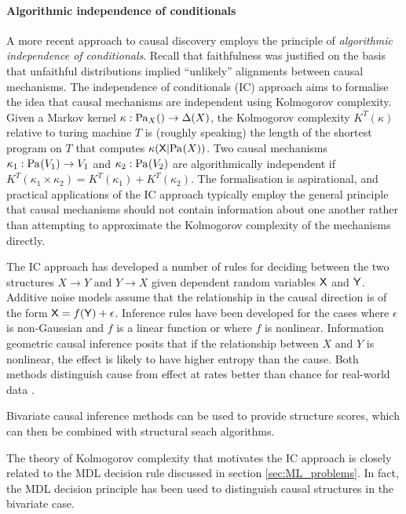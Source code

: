 \paragraph{Algorithmic independence of conditionals}

A more recent approach to causal discovery employs the principle of \emph{algorithmic independence of conditionals}. Recall that faithfulness was justified on the basis that unfaithful distributions implied ``unlikely'' alignments between causal mechanisms. The independence of conditionals (IC) approach aims to formalise the idea that causal mechanisms are independent using Kolmogorov complexity. Given a Markov kernel $\kappa:\text{Pa}_{X}()\to \Delta(X)$, the Kolmogorov complexity $K^T(\kappa)$ relative to turing machine $T$ is (roughly speaking) the length of the shortest program on $T$ that computes $\kappa(\mathsf{X}|\text{Pa}_{}(X))$\cite{kolmogorov_three_1968,lemeire_replacing_2013}. Two causal mechanisms $\kappa_1:\text{Pa}_{}(V_1)\to V_1$ and $\kappa_2:\text{Pa}_{}(V_2)$ are algorithmically independent if $K^T(\kappa_1\times\kappa_2)=K^T(\kappa_1)+K^T(\kappa_2)$. The formalisation is aspirational, and practical applications of the IC approach typically employ the general principle that causal mechanisms should not contain information about one another rather than attempting to approximate the Kolmogorov complexity of the mechanisms directly\cite{lemeire_replacing_2013}. 

The IC approach has developed a number of rules for deciding between the two structures $X\to Y$ and $Y\to X$ given dependent random variables $\mathsf{X}$ and $\mathsf{Y}$. Additive noise models assume that the relationship in the causal direction is of the form $\mathsf{X}=f(\mathsf{Y})+\epsilon$. Inference rules have been developed for the cases where $\epsilon$ is non-Gaussian and $f$ is a linear function or where $f$ is nonlinear\cite{kano_causal_2003,hoyer_estimation_2008,hoyer_nonlinear_2009}. Information geometric causal inference posits that if the relationship between $X$ and $Y$ is nonlinear, the effect is likely to have higher entropy than the cause. Both methods distinguish cause from effect at rates better than chance for real-world data \cite{mooij_j.m._distinguishing_2016}.

Bivariate causal inference methods can be used to provide structure scores, which can then be combined with structural seach algorithms\cite{press_elements_nodate}.

The theory of Kolmogorov complexity that motivates the IC approach is closely related to the MDL decision rule discussed in section \ref{sec:ML_problems}. In fact, the MDL decision principle has been used to distinguish causal structures in the bivariate case\cite{budhathoki_causal_2016}.


